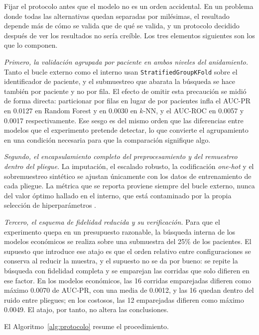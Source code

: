\documentclass[pdflatex,sn-mathphys-num]{sn-jnl}
\begin{document}
Fijar el protocolo antes que el modelo no es un orden accidental. En un problema donde todas las alternativas quedan separadas por milésimas, el resultado depende más de cómo se valida que de qué se valida, y un protocolo decidido después de ver los resultados no sería creíble. Los tres elementos siguientes son los que lo componen.

\emph{Primero, la validación agrupada por paciente en ambos niveles del anidamiento.} Tanto el bucle externo como el interno usan \texttt{StratifiedGroupKFold} sobre el identificador de paciente, y el submuestreo que abarata la búsqueda se hace también por paciente y no por fila. El efecto de omitir esta precaución se midió de forma directa: particionar por filas en lugar de por pacientes infla el AUC-PR en 0.0127 en Random Forest y en 0.0030 en $k$-NN, y el AUC-ROC en 0.0057 y 0.0017 respectivamente. Ese sesgo es del mismo orden que las diferencias entre modelos que el experimento pretende detectar, lo que convierte el agrupamiento en una condición necesaria para que la comparación signifique algo.

\emph{Segundo, el encapsulamiento completo del preprocesamiento y del remuestreo dentro del pliegue.} La imputación, el escalado robusto, la codificación \emph{one-hot} y el sobremuestreo sintético se ajustan únicamente con los datos de entrenamiento de cada pliegue. La métrica que se reporta proviene siempre del bucle externo, nunca del valor óptimo hallado en el interno, que está contaminado por la propia selección de hiperparámetros \cite{bib_cawley,bib_varma}.

\emph{Tercero, el esquema de fidelidad reducida y su verificación.} Para que el experimento quepa en un presupuesto razonable, la búsqueda interna de los modelos económicos se realiza sobre una submuestra del 25\% de los pacientes. El supuesto que introduce ese atajo es que el orden relativo entre configuraciones se conserva al reducir la muestra, y el supuesto no se da por bueno: se repite la búsqueda con fidelidad completa y se emparejan las corridas que solo difieren en ese factor. En los modelos económicos, las 16 corridas emparejadas difieren como máximo 0.0070 de AUC-PR, con una media de 0.0012, y las 16 quedan dentro del ruido entre pliegues; en los costosos, las 12 emparejadas difieren como máximo 0.0049. El atajo, por tanto, no altera las conclusiones.

El Algoritmo~\ref{alg:protocolo} resume el procedimiento.
\end{document}
